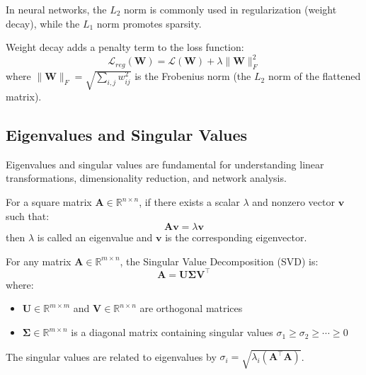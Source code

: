 In neural networks, the $L_2$ norm is commonly used in regularization (weight decay), while the $L_1$ norm promotes sparsity.

\begin{example}
Weight decay adds a penalty term to the loss function:
\begin{equation}
\mathcal{L}_{reg}(\mathbf{W}) = \mathcal{L}(\mathbf{W}) + \lambda \|\mathbf{W}\|_F^2
\end{equation}
where $\|\mathbf{W}\|_F = \sqrt{\sum_{i,j} w_{ij}^2}$ is the Frobenius norm (the $L_2$ norm of the flattened matrix).
\end{example}

\subsection{Eigenvalues and Singular Values}

Eigenvalues and singular values are fundamental for understanding linear transformations, dimensionality reduction, and network analysis.

\begin{definition}
For a square matrix $\mathbf{A} \in \mathbb{R}^{n \times n}$, if there exists a scalar $\lambda$ and nonzero vector $\mathbf{v}$ such that:
\begin{equation}
\mathbf{A}\mathbf{v} = \lambda \mathbf{v}
\end{equation}
then $\lambda$ is called an eigenvalue and $\mathbf{v}$ is the corresponding eigenvector.
\end{definition}

\begin{definition}
For any matrix $\mathbf{A} \in \mathbb{R}^{m \times n}$, the Singular Value Decomposition (SVD) is:
\begin{equation}
\mathbf{A} = \mathbf{U}\mathbf{\Sigma}\mathbf{V}^\top
\end{equation}
where:
\begin{itemize}
    \item $\mathbf{U} \in \mathbb{R}^{m \times m}$ and $\mathbf{V} \in \mathbb{R}^{n \times n}$ are orthogonal matrices
    \item $\mathbf{\Sigma} \in \mathbb{R}^{m \times n}$ is a diagonal matrix containing singular values $\sigma_1 \geq \sigma_2 \geq \cdots \geq 0$
\end{itemize}
The singular values are related to eigenvalues by $\sigma_i = \sqrt{\lambda_i(\mathbf{A}^\top\mathbf{A})}$.
\end{definition}

